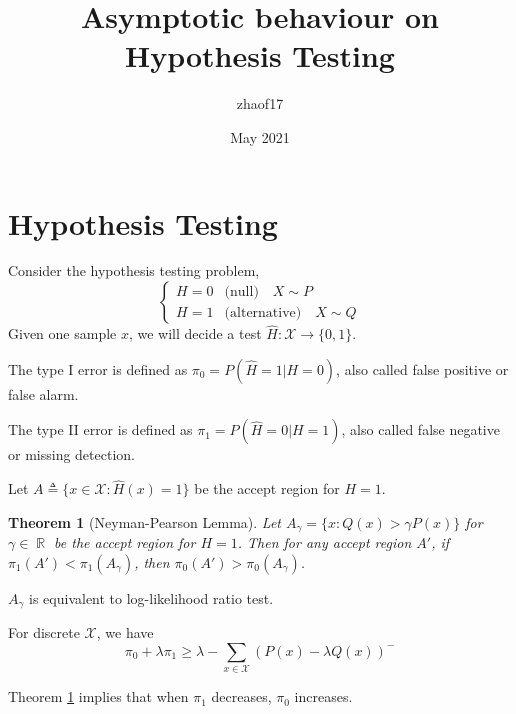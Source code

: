 \documentclass{article}
\title{Asymptotic behaviour on Hypothesis Testing }
\author{zhaof17 }
\date{May 2021}
\DeclareMathOperator{\R}{\mathbb{R}}
\newtheorem{theorem}{Theorem}
\begin{document}
\maketitle

\section{Hypothesis Testing}
Consider the hypothesis testing problem,
\begin{equation}
    \begin{cases}
    H=0 & \textrm{(null)} \quad X \sim P \\
    H=1 & \textrm{(alternative)} \quad X \sim Q
    \end{cases}
\end{equation}
Given one sample $x$, we will decide a test
$\widehat{H}: \mathcal{X} \to \{0,1\}$.

The type I error is defined as $\pi_0 = P(\widehat{H}=1
| H=0)$, also called false positive or false alarm.

The type II error is defined as $\pi_1 = P(\widehat{H}=0
| H=1)$,
also called false negative or missing detection.

Let $A\triangleq \{x\in \mathcal{X}: \widehat{H}(x)=1\}$
be the accept region for $H=1$.
\begin{theorem}[Neyman-Pearson Lemma]\label{thm:np}
Let $A_{\gamma} = \{x:Q(x) > \gamma P(x)\}$
for $\gamma \in \R$ be the accept region for $H=1$. Then for any accept region $A'$,
if $\pi_1(A') < \pi_1(A_{\gamma})$,
then $\pi_0(A') > \pi_0(A_{\gamma})$.
\end{theorem}
$A_{\gamma}$ is equivalent to log-likelihood ratio
test.

For discrete $\mathcal{X}$, we have
\begin{equation}\label{eq:p0p1}
\pi_0 + \lambda \pi_1 \geq \lambda - \sum_{x\in \mathcal{X}} (P(x) - \lambda Q(x))^{-}
\end{equation}

Theorem \ref{thm:np} implies that
when $\pi_1$ decreases, $\pi_0$ increases.
\end{document}
